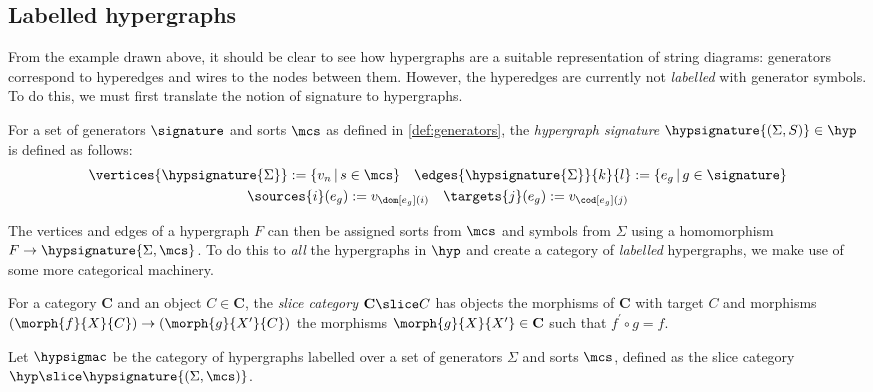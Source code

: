 \subsection{Labelled hypergraphs}

From the example drawn above, it should be clear to see how hypergraphs are a
suitable representation of string diagrams: generators correspond to hyperedges
and wires to the nodes between them.
However, the hyperedges are currently not \emph{labelled} with generator
symbols.
To do this, we must first translate the notion of signature to hypergraphs.

\begin{definition}
    For a set of generators \(\signature\) and sorts \(\mcs\) as defined
    in \cref{def:generators}, the \emph{hypergraph signature}
    \(\hypsignature{(\Sigma, S)} \in \hyp\) is defined as follows:
    \begin{gather*}
        \vertices{\hypsignature{\Sigma}} := \{ v_n \,|\, s \in \mcs\}
        \quad
        \edges{\hypsignature{\Sigma}}{k}{l} := \{ e_g \,|\, g \in \signature\}
        \\
        \sources{i}(e_g) := v_{\dom[e_g](i)}
        \quad
        \targets{j}(e_g) := v_{\cod[e_g](j)}
    \end{gather*}
\end{definition}

\begin{example}
\end{example}

The vertices and edges of a hypergraph \(F\) can then be assigned sorts from
\(\mcs\) and symbols from \(\Sigma\) using a homomorphism
\(F \to \hypsignature{\Sigma,\mcs}\).
To do this to \emph{all} the hypergraphs in \(\hyp\) and create a category of
\emph{labelled} hypergraphs, we make use of some more categorical machinery.

\begin{definition}
    For a category \(\mathbf{C}\) and an object \(C \in \mathbf{C}\), the
    \emph{slice category} \(\mathbf{C} \slice C\) has objects the morphisms of
    \(\mathbf{C}\) with target \(C\) and morphisms
    \((\morph{f}{X}{C}) \to (\morph{g}{X^\prime}{C})\) the morphisms
    \(\morph{g}{X}{X^\prime} \in \mathbf{C}\) such that \(f^\prime\circ g = f\).
\end{definition}

\begin{definition}
    Let \(\hypsigmac\) be the category of hypergraphs labelled over a set of
    generators \(\Sigma\) and sorts \(\mcs\), defined as the slice category
    \(\hyp \slice \hypsignature{(\Sigma, \mcs)}\).
\end{definition}

\begin{example}
\end{example}